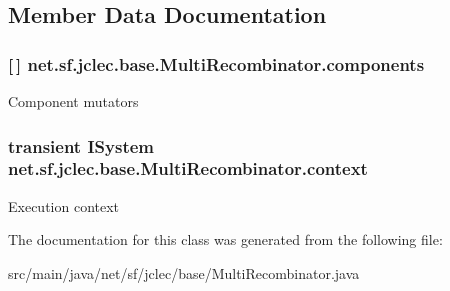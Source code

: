 \subsection{Member Data Documentation}
\hypertarget{classnet_1_1sf_1_1jclec_1_1base_1_1_multi_recombinator_a343664f4072209d95af0b554548b522a}{
\subsubsection[{components}]{ \mbox{[}$\,$\mbox{]} net.\-sf.\-jclec.\-base.\-Multi\-Recombinator.\-components\hspace{0.3cm}{\ttfamily [protected]}}}\label{classnet_1_1sf_1_1jclec_1_1base_1_1_multi_recombinator_a343664f4072209d95af0b554548b522a}
Component mutators \hypertarget{classnet_1_1sf_1_1jclec_1_1base_1_1_multi_recombinator_ab501674a548d5e3da0f711a99188eeb2}{
\subsubsection[{context}]{\setlength{\rightskip}{0pt plus 5cm}transient {\bf I\-System} net.\-sf.\-jclec.\-base.\-Multi\-Recombinator.\-context\hspace{0.3cm}{\ttfamily [protected]}}}\label{classnet_1_1sf_1_1jclec_1_1base_1_1_multi_recombinator_ab501674a548d5e3da0f711a99188eeb2}
Execution context 

The documentation for this class was generated from the following file\-:\begin{DoxyCompactItemize}
\item 
src/main/java/net/sf/jclec/base/Multi\-Recombinator.\-java\end{DoxyCompactItemize}
